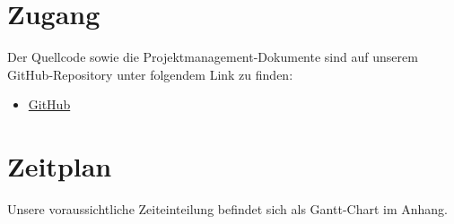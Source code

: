 \documentclass[a4paper,12pt]{article}
\begin{document}
\section{Zugang} \label{zugang}
Der Quellcode sowie die Projektmanagement-Dokumente sind auf unserem GitHub-Repository unter folgendem Link zu finden: 
\begin{itemize}
     \item \href{https://github.com/wittrockscode/geosoft2-projekt/tree/main}{GitHub}
\end{itemize}
   

\section{Zeitplan} \label{zeitplan}
Unsere voraussichtliche Zeiteinteilung befindet sich als Gantt-Chart im Anhang.


\clearpage
% 
\end{document}
